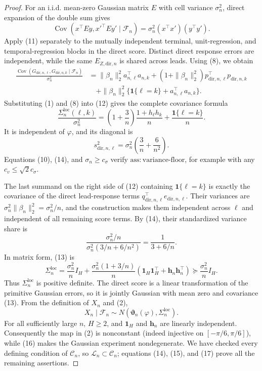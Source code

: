 \documentclass{article}
\begin{document}
\begin{proof}
For an i.i.d. mean-zero Gaussian matrix \(E\) with cell variance
\(\sigma_n^2\), direct expansion of the double sum gives
\[
 \operatorname{Cov}(x^{\top}Ey,x'^{\top}Ey'\mid\mathcal F_n)
 =\sigma_n^2(x^{\top}x')(y^{\top}y').                       \tag{11}
\]
Apply (11) separately to the mutually independent terminal, unit-regression,
and temporal-regression blocks in the direct score.  Distinct direct response
errors are independent, while the same \(E_{Z,\mathrm{dir},n}\) is shared
across leads.  Using (8), we obtain
\[
\begin{aligned}
 \frac{\operatorname{Cov}(G_{\mathrm{dir},n,\ell},
                           G_{\mathrm{dir},n,k}\mid\mathcal F_n)}{\sigma_n^2}
 &=\|\beta_n\|_2^2a_{n,\ell}^{\top}a_{n,k}
 +(1+\|\beta_n\|_2^2)
       p_{\mathrm{dir},n,\ell}^{\top}p_{\mathrm{dir},n,k}\\
 &\quad+\|\beta_n\|_2^2
       \{\boldsymbol 1\{\ell=k\}+a_{n,\ell}^{\top}a_{n,k}\}.
\end{aligned}                                                 \tag{12}
\]
Substituting (1) and (8) into (12) gives the complete covariance formula
\[
 \frac{\Sigma_n^{\mathrm{loc}}(\ell,k)}{\sigma_n^2}
 =\left(1+\frac3n\right)\frac{1+h_\ell h_k}{n}
  +\frac{\boldsymbol 1\{\ell=k\}}{n}.                      \tag{13}
\]
It is independent of \(\varphi\), and its diagonal is
\[
 s_{\mathrm{dir},n,\ell}^2
 =\sigma_n^2\left(\frac3n+\frac6{n^2}\right).              \tag{14}
\]
Equations (10), (14), and \(\sigma_n\geq c_\sigma\) verify
\(\mathrm{ass{:}variance\mbox{-}floor}\), for example with any
\(c_v\leq\sqrt2c_\sigma\).

The last summand on the right side of (12) containing
\(\boldsymbol 1\{\ell=k\}\) is exactly the covariance of the direct
lead-response terms
\(q_{\mathrm{dir},n,\ell}^{\top}e_{\mathrm{dir},n,\ell}\).  Their variances
are \(\sigma_n^2\|\beta_n\|_2^2=\sigma_n^2/n\), and the construction makes
them independent across \(\ell\) and independent of all remaining score
terms.  By (14), their standardized variance share is
\[
 \frac{\sigma_n^2/n}
      {\sigma_n^2(3/n+6/n^2)}=\frac1{3+6/n}.                 \tag{15}
\]
In matrix form, (13) is
\[
 \Sigma_n^{\mathrm{loc}}
 =\frac{\sigma_n^2}{n}I_H
  +\frac{\sigma_n^2(1+3/n)}{n}
    (\boldsymbol 1_H\boldsymbol 1_H^{\top}
      +\boldsymbol h_n\boldsymbol h_n^{\top})
 \succeq \frac{\sigma_n^2}{n}I_H.                           \tag{16}
\]
Thus \(\Sigma_n^{\mathrm{loc}}\) is positive definite.  The direct score is
a linear transformation of the primitive Gaussian errors, so it is jointly
Gaussian with mean zero and covariance (13).  From the definition of \(X_n\)
and (2),
\[
 X_n\mid\mathcal F_n
 \sim N(\boldsymbol\vartheta_n(\varphi),\Sigma_n^{\mathrm{loc}}). \tag{17}
\]
For all sufficiently large \(n\), \(H\geq2\), and
\(\boldsymbol 1_H\) and \(\boldsymbol h_n\) are linearly independent.
Consequently the map in (2) is nonconstant (indeed injective on
\([-\pi/6,\pi/6]\)), while (16) makes the Gaussian experiment nondegenerate.
We have checked every defining condition of \(\mathcal C_n\), so
\(\mathcal L_n\subset\mathcal C_n\); equations (14), (15), and (17) prove all
the remaining assertions.
\end{proof}
\end{document}
